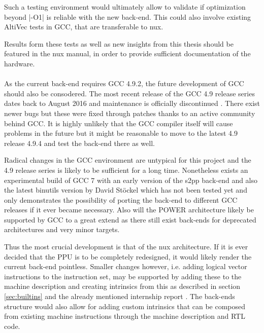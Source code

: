Such a testing environment would ultimately allow to validate if optimization beyond |-O1| is reliable with the new back-end.
This could also involve existing AltiVec tests in GCC, that are transferable to nux.

Results form these tests as well as new insights from this thesis should be featured in the nux manual, in order to provide sufficient documentation of the hardware.
\\
\\
As the current back-end requires GCC 4.9.2, the future development of GCC should also be consodered.
The most recent release of the GCC 4.9 release series dates back to August 2016 and maintenance is officially discontinued \cite{https://gcc.gnu.org/gcc-4.9/}.
There exist newer bugs but these were fixed through patches thanks to an active community behind GCC.
It is highly unlikely that the GCC compiler itself will cause problems in the future but it might be reasonable to move to the latest 4.9 release 4.9.4 and test the back-end there as well.

Radical changes in the GCC environment are untypical for this project and the 4.9 release series is likely to be sufficient for a long time. 
Nonetheless exists an experimental build of GCC 7 with an early version of the s2pp back-end and also the latest binutils version by David Stöckel which has not been tested yet and only demonstrates the possibility of porting the back-end to different GCC releases if it ever became necessary.
Also will the POWER architecture likely be supported by GCC to a great extend as there still exist back-ends for deprecated architectures and very minor targets.

Thus the most crucial development is that of the nux architecture.
If it is ever decided that the  \ac{PPU} is to be completely redesigned, it would likely render the current back-end pointless.
Smaller changes however, i.e. adding logical vector instructions to the instruction set, may be supported by adding these to the machine description and creating intrinsics from this as described in section \ref{sec:builtins} and the already mentioned internship report \citep{heimbrecht_2017internship}.
The back-ends structure would also allow for adding custom intrinsics that can be composed from existing machine instructions through the machine description and \ac{RTL} code.

